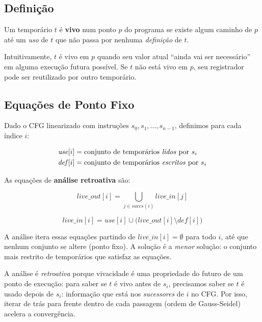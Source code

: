 \subsection{Definição}

\begin{Definition}[Vivacidade]
  Um temporário $t$ é \textbf{vivo} num ponto $p$ do programa se existe
  algum caminho de $p$ até um \emph{uso} de $t$ que não passa por
  nenhuma \emph{definição} de $t$.
\end{Definition}

Intuitivamente, $t$ é vivo em $p$ quando seu valor atual ``ainda vai ser
necessário'' em alguma execução futura possível. Se $t$ não está vivo em
$p$, seu registrador pode ser reutilizado por outro temporário.

\subsection{Equações de Ponto Fixo}

Dado o CFG linearizado com instruções $s_0, s_1, \ldots, s_{n-1}$,
definimos para cada índice $i$:

\begin{align*}
  \mathit{use}[i] &= \text{conjunto de temporários \emph{lidos} por } s_i \\
  \mathit{def}[i] &= \text{conjunto de temporários \emph{escritos} por } s_i
\end{align*}

As equações de \textbf{análise retroativa} são:

\[
  \mathit{live\_out}[i] = \bigcup_{j \in \mathit{succs}(i)} \mathit{live\_in}[j]
\]

\[
  \mathit{live\_in}[i] = \mathit{use}[i] \cup
  \bigl(\mathit{live\_out}[i] \setminus \mathit{def}[i]\bigr)
\]

A análise itera essas equações partindo de $\mathit{live\_in}[i] = \emptyset$
para todo $i$, até que nenhum conjunto se altere (ponto fixo). A solução
é a \emph{menor} solução: o conjunto mais restrito de temporários que
satisfaz as equações.

\begin{remark}
  A análise é \emph{retroativa} porque vivacidade é uma propriedade do
  futuro de um ponto de execução: para saber se $t$ é vivo antes de
  $s_i$, precisamos saber se $t$ é usado depois de $s_i$: informação
  que está nos \emph{sucessores} de $i$ no CFG. Por isso, iterar de
  trás para frente dentro de cada passagem (ordem de Gauss-Seidel)
  acelera a convergência.
\end{remark}

